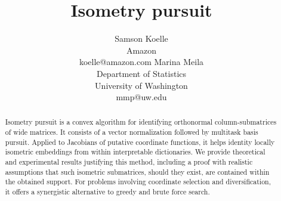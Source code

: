 \documentclass{article}
\title{Isometry pursuit}
\author{%
  Samson Koelle \\
  Amazon  \\
  koelle@amazon.com
  \And
  Marina Meila \\
  Department of Statistics\\
  University of Washington \\
  mmp@uw.edu
}
\begin{document}
\maketitle

\begin{abstract}
Isometry pursuit is a convex algorithm for identifying orthonormal column-submatrices of wide matrices.
It consists of a vector normalization followed by multitask basis pursuit.
Applied to Jacobians of putative coordinate functions, it helps identity locally isometric embeddings from within interpretable dictionaries.
We provide theoretical and experimental results justifying this method, including a proof with realistic assumptions that such isometric submatrices, should they exist, are contained within the obtained support.
For problems involving coordinate selection and diversification, it offers a synergistic alternative to greedy and brute force search.
\end{abstract}








\newpage



\newpage



\newpage


\end{document}
